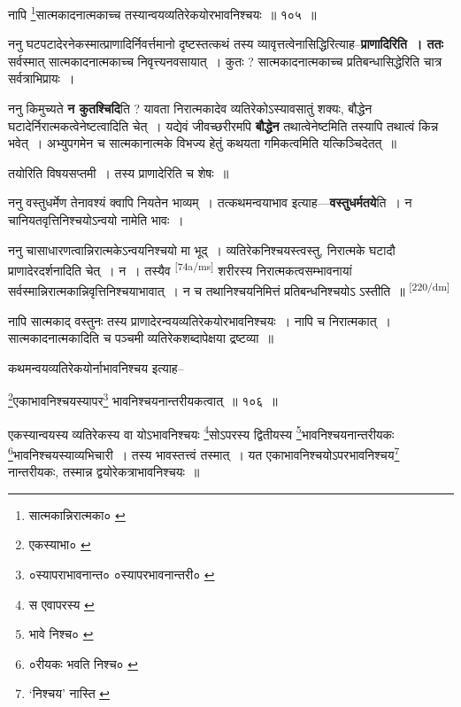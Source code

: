 \documentclass[article,12pt,a4paper]{memoir}
\begin{document}
	  \pstart नापि \footnote{सात्मकान्निरात्मका० \cite{dp-msB} \cite{dp-msD} \cite{dp-edP} \cite{dp-edH} \cite{dp-edE} \cite{dp-edN}}सात्मकादनात्मकाच्च तस्यान्वयव्यतिरेकयोरभावनिश्चयः ॥ १०५ ॥
	\pend
      

	  \pstart ननु घटपटादेरनेकस्मात्प्राणादिर्निवर्त्तमानो दृष्टस्तत्कथं तस्य व्यावृत्तत्वेनासिद्धिरित्याह--\textbf{प्राणादिरिति । ततः} सर्वस्मात् सात्मकादनात्मकाच्च निवृत्त्यनवसायात् । कुतः ? सात्मकादनात्मकाच्च प्रतिबन्धासिद्धेरिति चात्र सर्वत्राभिप्रायः ।
	\pend
      

	  \pstart ननु किमुच्यते \textbf{न कुतश्चिदि}ति ? यावता निरात्मकादेव व्यतिरेकोऽस्यावसातुं शक्यः, बौद्धेन घटादेर्निरात्मकत्वेनेष्टत्वादिति चेत् । यद्येवं जीवच्छरीरमपि \textbf{बौद्धेन} तथात्वेनेष्टमिति तस्यापि तथात्वं किन्न भवेत् । अभ्युपगमेन च सात्मकानात्मके विभज्य हेतुं कथयता गमिकत्वमिति यत्किञ्चिदेतत् ॥
	\pend
      

	  \pstart तयोरिति विषयसप्तमी । तस्य प्राणादेरिति च शेषः ॥
	\pend
      

	  \pstart ननु वस्तुधर्मेण तेनावश्यं क्वापि नियतेन भाव्यम् । तत्कथमन्वयाभाव इत्याह—\textbf{वस्तुधर्मतये}ति । न चानियतवृत्तिनिश्चयोऽन्वयो नामेति भावः ।
	\pend
      

	  \pstart ननु चासाधारणत्वान्निरात्मकेऽन्वयनिश्चयो मा भूद् । व्यतिरेकनिश्चयस्त्वस्तु, निरात्मके घटादौ प्राणादेरदर्शनादिति चेत् । न । तस्यैव \leavevmode\textsuperscript{\rmlatinfont\tiny [74a/ms]} शरीरस्य निरात्मकत्वसम्भावनायां सर्वस्मान्निरात्मकान्निवृत्तिनिश्चयाभावात् । न च तथानिश्चयनिमित्तं प्रतिबन्धनिश्चयोऽ ऽस्तीति ॥
	\pend
      \leavevmode\textsuperscript{\rmlatinfont\tiny [220/dm]}

	  \pstart नापि सात्मकाद् वस्तुनः तस्य प्राणादेरन्वयव्यतिरेकयोरभावनिश्चयः । नापि च निरात्मकात् । सात्मकादनात्मकादिति च पञ्चमी व्यतिरेकशब्दापेक्षया द्रष्टव्या ॥
	\pend
       

	  \pstart कथमन्वयव्यतिरेकयोर्नाभावनिश्चय इत्याह--
	\pend
       

	  \pstart \footnote{एकस्याभा० \cite{dp-msC}}एकाभावनिश्चयस्यापर\footnote{०स्यापराभावनान्त० \cite{dp-msB} \cite{dp-edP} \cite{dp-edH} ०स्यापरभावनान्तरी० \cite{dp-msD} \cite{dp-edE}} भावनिश्चयनान्तरीयकत्वात् ॥ १०६ ॥
	\pend
       

	  \pstart एकस्यान्वयस्य व्यतिरेकस्य वा योऽभावनिश्चयः \footnote{स एवापरस्य \cite{dp-edE} \cite{dp-edN}}सोऽपरस्य द्वितीयस्य \footnote{भावे निश्च० \cite{dp-msA} \cite{dp-msB} \cite{dp-edP} \cite{dp-edH}}भावनिश्चयनान्तरीयकः \footnote{०रीयकः भवति निश्च० \cite{dp-msA} \cite{dp-msB} \cite{dp-edP} \cite{dp-edH}}भावनिश्चयस्याव्यभिचारी । तस्य भावस्तत्त्वं तस्मात् । यत एकाभावनिश्चयोऽपरभावनिश्चय\footnote{‘निश्चय’ नास्ति \cite{dp-msA} \cite{dp-msC}} नान्तरीयकः, तस्मान्न द्वयोरेकत्राभावनिश्चयः ॥
	\pend
       
\end{document}
